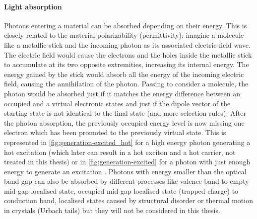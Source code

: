 		\paragraph{Light absorption}
		Photons entering a material can be absorbed depending on their energy.
		This is closely related to the material polarizability (permittivity): imagine a molecule like a metallic stick and the incoming photon as its associated electric field wave.
		The electric field would cause the electrons and the holes inside the metallic stick to accumulate at its two opposite extremities, increasing its internal energy.
		The energy gained by the stick would absorb all the energy of the incoming electric field, causing the annihilation of the photon.
		Passing to consider a molecule, the photon would be absorbed just if it matches the energy difference between an occupied and a virtual electronic states and just if the dipole vector of the starting state is not identical to the final state (and more selection rules).
		After the photon absorption, the previously occupied energy level is now missing one electron which has been promoted to the previously virtual state.
		This is represented in \cref{fig:generation-excited_hot} for a high energy photon generating a hot excitation  (which later can result in a hot exciton and a hot carrier, not treated in this thesis) or in \cref{fig:generation-excited} for a photon with just enough energy to generate an excitation .
		Photons with energy smaller than the optical band gap can also be absorbed by different processes like valence band to empty mid gap localised state, occupied mid gap localised state (trapped charge) to conduction band, localised states caused by structural disorder or thermal motion in crystals (Urbach tails) but they will not be considered in this thesis.
		
